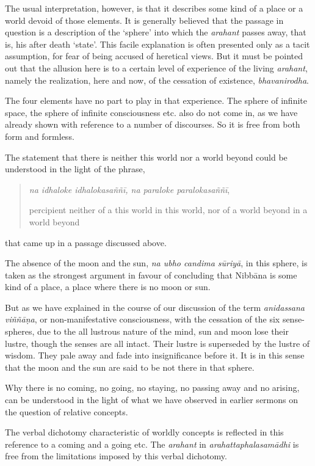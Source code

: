 The usual interpretation, however, is that it describes some kind of a place or a world devoid of those elements. It is generally believed that the passage in question is a description of the `sphere' into which the \emph{arahant} passes away, that is, his after death `state'. This facile explanation is often presented only as a tacit assumption, for fear of being accused of heretical views. But it must be pointed out that the allusion here is to a certain level of experience of the living \emph{arahant}, namely the realization, here and now, of the cessation of existence, \emph{bhavanirodha}.

The four elements have no part to play in that experience. The sphere of infinite space, the sphere of infinite consciousness etc. also do not come in, as we have already shown with reference to a number of discourses. So it is free from both form and formless.

The statement that there is neither this world nor a world beyond could be understood in the light of the phrase,

\begin{quote}
\emph{na idhaloke idhalokasaññī, na paraloke paralokasaññī},

percipient neither of a this world in this world, nor of a world beyond in a world beyond
\end{quote}

that came up in a passage discussed above.

The absence of the moon and the sun, \emph{na ubho candima sūriyā}, in this sphere, is taken as the strongest argument in favour of concluding that Nibbāna is some kind of a place, a place where there is no moon or sun.

But as we have explained in the course of our discussion of the term \emph{anidassana viññāṇa}, or non-manifestative consciousness, with the cessation of the six sense-spheres, due to the all lustrous nature of the mind, sun and moon lose their lustre, though the senses are all intact. Their lustre is superseded by the lustre of wisdom. They pale away and fade into insignificance before it. It is in this sense that the moon and the sun are said to be not there in that sphere.

Why there is no coming, no going, no staying, no passing away and no arising, can be understood in the light of what we have observed in earlier sermons on the question of relative concepts.

The verbal dichotomy characteristic of worldly concepts is reflected in this reference to a coming and a going etc. The \emph{arahant} in \emph{arahattaphalasamādhi} is free from the limitations imposed by this verbal dichotomy.

